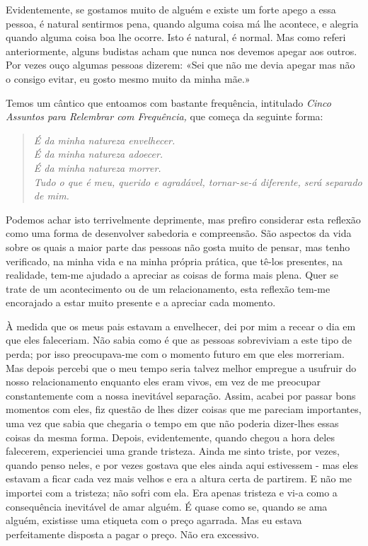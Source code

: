 Evidentemente, se gostamos muito de alguém e existe um forte apego a
essa pessoa, é natural sentirmos pena, quando alguma coisa má lhe
acontece, e alegria quando alguma coisa boa lhe ocorre. Isto é natural,
é normal. Mas como referi anteriormente, alguns budistas acham que nunca
nos devemos apegar aos outros. Por vezes ouço algumas pessoas dizerem:
«Sei que não me devia apegar mas não o consigo evitar, eu gosto mesmo
muito da minha mãe.»

Temos um cântico que entoamos com bastante frequência, intitulado
\emph{Cinco Assuntos para Relembrar com Frequência,} que começa da
seguinte forma:

\begin{quote}
\itshape
É da minha natureza envelhecer.\\
É da minha natureza adoecer.\\
É da minha natureza morrer.\\
Tudo o que é meu, querido e agradável, tornar-se-á diferente, será
separado de mim.
\end{quote}

Podemos achar isto terrivelmente deprimente, mas prefiro considerar esta
reflexão como uma forma de desenvolver sabedoria e compreensão. São
aspectos da vida sobre os quais a maior parte das pessoas não gosta
muito de pensar, mas tenho verificado, na minha vida e na minha própria
prática, que tê-los presentes, na realidade, tem-me ajudado a apreciar
as coisas de forma mais plena. Quer se trate de um acontecimento ou de
um relacionamento, esta reflexão tem-me encorajado a estar muito
presente e a apreciar cada momento.

À medida que os meus pais estavam a envelhecer, dei por mim a recear o
dia em que eles faleceriam. Não sabia como é que as pessoas sobreviviam
a este tipo de perda; por isso preocupava-me com o momento futuro em que
eles morreriam. Mas depois percebi que o meu tempo seria talvez melhor
empregue a usufruir do nosso relacionamento enquanto eles eram vivos, em
vez de me preocupar constantemente com a nossa inevitável separação.
Assim, acabei por passar bons momentos com eles, fiz questão de lhes
dizer coisas que me pareciam importantes, uma vez que sabia que chegaria
o tempo em que não poderia dizer-lhes essas coisas da mesma forma.
Depois, evidentemente, quando chegou a hora deles falecerem,
experienciei uma grande tristeza. Ainda me sinto triste, por vezes,
quando penso neles, e por vezes gostava que eles ainda aqui estivessem -
mas eles estavam a ficar cada vez mais velhos e era a altura certa de
partirem. E não me importei com a tristeza; não sofri com ela. Era
apenas tristeza e vi-a como a consequência inevitável de amar alguém. É
quase como se, quando se ama alguém, existisse uma etiqueta com o preço
agarrada. Mas eu estava perfeitamente disposta a pagar o preço. Não era
excessivo.

